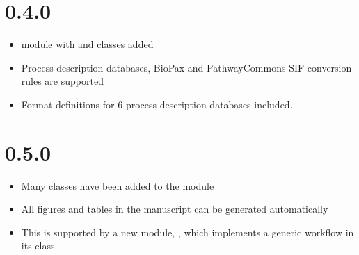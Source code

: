 \documentclass[letterpaper,10pt,english]{sphinxmanual}
\begin{document}
\section{0.4.0}
\label{\detokenize{changelog:id4}}\begin{itemize}
\item {} 
 module with  and  classes added

\item {} 
Process description databases, BioPax and PathwayCommons SIF conversion
rules are supported

\item {} 
Format definitions for 6 process description databases included.

\end{itemize}


\section{0.5.0}
\label{\detokenize{changelog:id5}}\begin{itemize}
\item {} 
Many classes have been added to the  module

\item {} 
All figures and tables in the manuscript can be generated automatically

\item {} 
This is supported by a new module, , which implements a generic
workflow in its  class.

\end{itemize}
\end{document}
